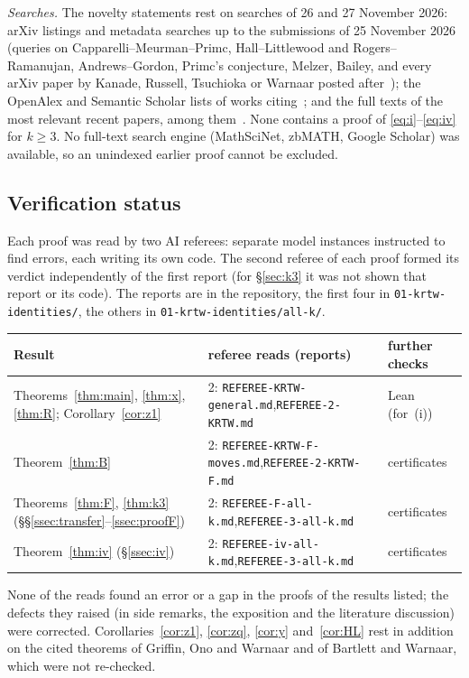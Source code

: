\documentclass[11pt]{amsart}
\theoremstyle{definition}
\numberwithin{equation}{section}
\newcommand{\fpath}[1]{\nolinkurl{#1}}
\begin{document}
\emph{Searches.} The novelty statements rest on searches of 26 and 27 November 2026: arXiv listings and
metadata searches up to the submissions of 25 November 2026 (queries on Capparelli--Meurman--Primc,
Hall--Littlewood and Rogers--Ramanujan, Andrews--Gordon, Primc's conjecture, Melzer, Bailey, and every arXiv
paper by Kanade, Russell, Tsuchioka or Warnaar posted after~\cite{KRTW}); the OpenAlex and Semantic Scholar
lists of works citing~\cite{KRTW}; and the full texts of the most relevant recent papers, among
them~\cite{Bartholdi,Ding,Kursungoz,Russell,Warnaar2026,KL,DJ}. None contains a proof of
\eqref{eq:i}--\eqref{eq:iv} for $k\ge3$. No full-text search engine (MathSciNet, zbMATH, Google
Scholar) was available, so an unindexed earlier proof cannot be excluded.

\subsection{Verification status}\label{ssec:reads}
Each proof was read by two AI referees: separate model instances instructed to find errors, each writing its
own code. The second referee of each proof formed its verdict independently of the first report (for §\ref{sec:k3}
it was not shown that report or its code). The reports are in the repository, the first four in
\fpath{01-krtw-identities/}, the others in \fpath{01-krtw-identities/all-k/}.
\begin{center}\footnotesize
\begin{tabular}{@{}p{}p{}p{}@{}}
\toprule
Result & referee reads (reports) & further checks\\
\midrule
Theorems~\ref{thm:main}, \ref{thm:x}, \ref{thm:R}; Corollary~\ref{cor:z1} & 2: \fpath{REFEREE-KRTW-general.md},\newline \fpath{REFEREE-2-KRTW.md} & Lean (for~(i))\\
Theorem~\ref{thm:B} & 2: \fpath{REFEREE-KRTW-F-moves.md},\newline \fpath{REFEREE-2-KRTW-F.md} & certificates\\
Theorems~\ref{thm:F}, \ref{thm:k3} (§§\ref{ssec:transfer}--\ref{ssec:proofF}) & 2: \fpath{REFEREE-F-all-k.md},\newline \fpath{REFEREE-3-all-k.md} & certificates\\
Theorem~\ref{thm:iv} (§\ref{ssec:iv}) & 2: \fpath{REFEREE-iv-all-k.md},\newline \fpath{REFEREE-3-all-k.md} & certificates\\
\bottomrule
\end{tabular}
\end{center}
None of the reads found an error or a gap in the proofs of the results listed; the defects they raised (in side
remarks, the exposition and the literature discussion) were corrected. Corollaries~\ref{cor:z1}, \ref{cor:zq}, \ref{cor:y} and~\ref{cor:HL} rest in addition on the
cited theorems of Griffin, Ono and Warnaar and of Bartlett and Warnaar, which were not re-checked.
\end{document}
